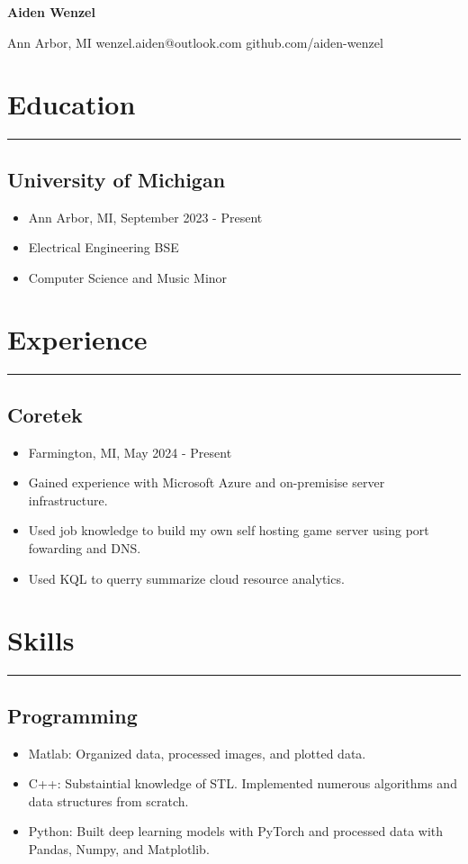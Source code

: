 \documentclass[10pt, letterpaper]{article}
\begin{document}
\thispagestyle{empty}
\begin{center}
	\textbf{\huge{Aiden Wenzel}}
	\vspace{3pt}

	Ann Arbor, MI wenzel.aiden@outlook.com github.com/aiden-wenzel
\end{center}

\section*{Education}
\hrule
\vspace{7pt}

\subsection*{University of Michigan}
\begin{itemize}[noitemsep]
	\item Ann Arbor, MI, September 2023 - Present
	\item Electrical Engineering BSE
	\item Computer Science and Music Minor
\end{itemize}

\section*{Experience}
\hrule
\vspace{7pt}

\subsection*{Coretek}
\begin{itemize}[noitemsep]
	\item Farmington, MI, May 2024 - Present
	\item Gained experience with Microsoft Azure and on-premisise server infrastructure.
	\item Used job knowledge to build my own self hosting game server using port fowarding and DNS.
	\item Used KQL to querry summarize cloud resource analytics.
\end{itemize}

\section*{Skills}
\hrule
\vspace{7pt}

\subsection*{Programming}
\begin{itemize}[noitemsep]
	\item Matlab: Organized data, processed images, and plotted data.
	\item C++: Substaintial knowledge of STL. Implemented numerous algorithms and data structures from scratch.
	\item Python: Built deep learning models with PyTorch and processed data with Pandas, Numpy, and Matplotlib.
\end{itemize}
\end{document}
